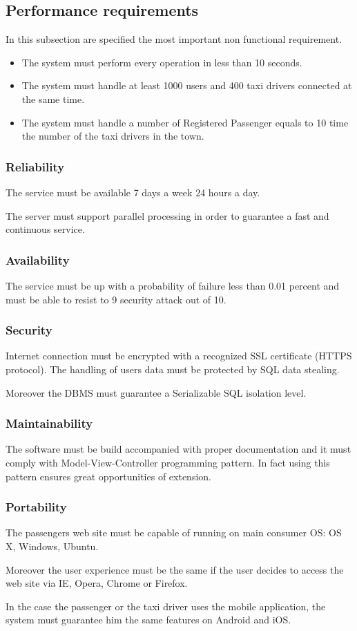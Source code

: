 \subsection{Performance requirements}
In this subsection are specified the most important non functional requirement.\par
\begin{itemize}
	\item The system must perform every operation in less than 10 seconds.
	\item The system must handle at least 1000 users and 400 taxi drivers connected at the same time.
	\item The system must handle a number of Registered Passenger equals to 10 time the number of the taxi drivers in the town.
\end{itemize}
\subsubsection{Reliability}
The service must be available 7 days a week 24 hours a day. \par The server must support parallel processing in order to guarantee a fast and continuous service.
\subsubsection{Availability}
The service must be up with a probability of failure less than 0.01 percent and must be able to resist to 9 security attack out of 10.
\subsubsection{Security}
Internet connection must be encrypted with a recognized SSL certificate (HTTPS protocol). The handling of users data must be protected by SQL data stealing.\par Moreover the DBMS must guarantee a Serializable SQL isolation level.
\subsubsection{Maintainability}
The software must be build accompanied with proper documentation and it must comply with Model-View-Controller programming pattern. In fact using this pattern ensures great opportunities of extension.
\subsubsection{Portability}
The passengers web site must be capable of running on main consumer OS: OS X, Windows, Ubuntu.\par
Moreover the user experience must be the same if the user decides to access the web site via IE, Opera, Chrome or Firefox.\par
In the case the passenger or the taxi driver uses the mobile application, the system must guarantee him the same features on Android and iOS.